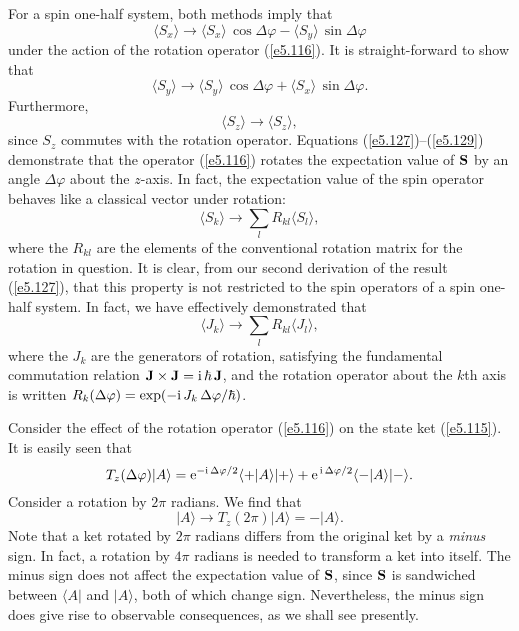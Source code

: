 For a  spin one-half system, both methods imply that
\begin{equation}\label{e5.127}
\langle S_x \rangle \rightarrow \langle S_x\rangle \,\cos\Delta\varphi
- \langle S_y\rangle\,\sin\Delta\varphi
\end{equation}
under the action of the rotation operator (\ref{e5.116}). It is straight-forward to
show that 
\begin{equation}
\langle S_y \rangle \rightarrow \langle S_y\rangle \,\cos\Delta\varphi
+ \langle S_x\rangle\,\sin\Delta\varphi.
\end{equation}
Furthermore, 
\begin{equation}\label{e5.129}
\langle S_z \rangle \rightarrow\langle S_z\rangle,
\end{equation}
since $S_z$ commutes with the rotation operator. Equations (\ref{e5.127})--(\ref{e5.129})
 demonstrate that
the operator (\ref{e5.116}) rotates the expectation value of ${\bf S}$ by an
angle $\Delta \varphi$ about the $z$-axis. In fact, the expectation value
of the spin operator behaves like a classical  vector under rotation:
\begin{equation}
\langle S_k \rangle \rightarrow \sum_l R_{kl} \langle S_l\rangle,
\end{equation}
where the $R_{kl}$ are the elements of the  conventional rotation matrix 
for the rotation in question. It is clear, from our  second derivation of
the result (\ref{e5.127}), that this property is not restricted to the spin operators of
a spin one-half system. In fact, we have effectively demonstrated that
\begin{equation}
\langle J_k \rangle \rightarrow \sum_l R_{kl} \langle J_l\rangle,
\end{equation}
where the $J_k$ are the generators of rotation, satisfying the fundamental
commutation relation ${\bf J}\times {\bf J} = {\rm i}\,\hbar\, {\bf J}$,
and the rotation operator about the $k$th axis is written
$R_k (\Delta\varphi) = \exp(-{\rm i}\,J_k\, \Delta\varphi/\hbar)$. 

Consider the effect of the rotation operator (\ref{e5.116}) on the state ket (\ref{e5.115}).
It is easily seen that
\begin{equation}\label{e5.132}
T_z(\Delta\varphi)|A\rangle = {\rm e}^{-{\rm i}\,\Delta\varphi/2}
\langle +|A\rangle |+\rangle +  {\rm e}^{\,{\rm i}\,\Delta\varphi/2}
\langle -|A\rangle |-\rangle.
\end{equation}
Consider a rotation by $2\pi$ radians. We find that
\begin{equation}\label{e5.133}
|A\rangle \rightarrow T_z(2\pi)|A\rangle = -|A\rangle.
\end{equation}
Note that a ket rotated by $2\pi$ radians differs from the original ket by a
{\em minus} sign. In fact, a rotation by $4\pi$ radians is needed to transform a ket
into itself. The minus sign does not affect the expectation value of
${\bf S}$, since ${\bf S}$ is sandwiched between $\langle A|$ and $| A\rangle$,
both of which change sign. Nevertheless, the minus sign does give rise to
observable consequences, as we shall see  presently. 

